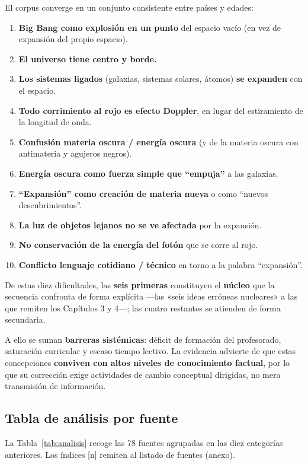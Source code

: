 El corpus converge en un conjunto consistente entre países y edades:

\begin{enumerate}
\item \textbf{Big Bang como explosión en un punto} del espacio vacío (en vez de expansión del propio espacio).
\item \textbf{El universo tiene centro y borde.}
\item \textbf{Los sistemas ligados} (galaxias, sistemas solares, átomos) \textbf{se expanden} con el espacio.
\item \textbf{Todo corrimiento al rojo es efecto Doppler}, en lugar del estiramiento de la longitud de onda.
\item \textbf{Confusión materia oscura / energía oscura} (y de la materia oscura con antimateria y agujeros negros).
\item \textbf{Energía oscura como fuerza simple que ``empuja''} a las galaxias.
\item \textbf{``Expansión'' como creación de materia nueva} o como ``nuevos descubrimientos''.
\item \textbf{La luz de objetos lejanos no se ve afectada} por la expansión.
\item \textbf{No conservación de la energía del fotón} que se corre al rojo.
\item \textbf{Conflicto lenguaje cotidiano / técnico} en torno a la palabra ``expansión''.
\end{enumerate}

\noindent De estas diez dificultades, las \textbf{seis primeras} constituyen el \textbf{núcleo} que la secuencia confronta de forma explícita ---las «seis ideas erróneas nucleares» a las que remiten los Capítulos 3 y 4---; las cuatro restantes se atienden de forma secundaria.

A ello se suman \textbf{barreras sistémicas}: déficit de formación del profesorado, saturación curricular y escaso tiempo lectivo. La evidencia \parencite{aretz2017} advierte de que estas concepciones \textbf{conviven con altos niveles de conocimiento factual}, por lo que su corrección exige actividades de cambio conceptual dirigidas, no mera transmisión de información.

\subsection{Tabla de análisis por fuente}\label{sec:tabla}

La Tabla~\ref{tab:analisis} recoge las 78 fuentes agrupadas en las diez categorías anteriores. Los índices [n] remiten al listado de fuentes (anexo).

